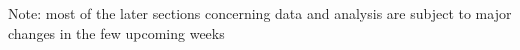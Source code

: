 \documentclass[
11pt, %
openany,
english, %
singlespacing, %
headsepline, %
]{Thesis} %
\begin{document}

Note: most of the later sections concerning data and analysis are subject to major changes in the few upcoming weeks



 




\appendix %



%
%


\printbibliography

\end{document}
